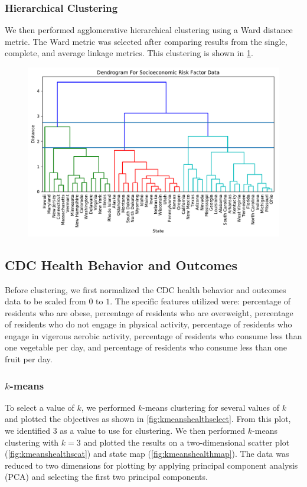 \documentclass{article}
\begin{document}
\subsubsection{Hierarchical Clustering}
We then performed agglomerative hierarchical clustering using a Ward distance metric. The Ward metric was selected after comparing results from the single, complete, and average linkage metrics. This clustering is shown in \cref{fig:dbsociodg}.

\begin{figure}[h]
\centering
\caption{}
\includegraphics[width=\linewidth]{images/socioeconomic_risk_factors_agglomerative_dendrogram.pdf}
\label{fig:dbsociodg}
\end{figure}

\subsection{CDC Health Behavior and Outcomes}
Before clustering, we first normalized the CDC health behavior and outcomes data to be scaled from $0$ to $1$. The specific features utilized were: percentage of residents who are obese, percentage of residents who are overweight, percentage of residents who do not engage in physical activity, percentage of residents who engage in vigerous aerobic activity, percentage of residents who consume less than one vegetable per day, and percentage of residents who consume less than one fruit per day.

\subsubsection{$k$-means}
To select a value of $k$, we performed $k$-means clustering for several values of $k$ and plotted the objectives as shown in \cref{fig:kmeanshealthselect}. From this plot, we identified $3$ as a value to use for clustering. We then performed $k$-means clustering with $k=3$ and plotted the results on a two-dimensional scatter plot (\ref{fig:kmeanshealthscat}) and state map (\ref{fig:kmeanshealthmap}). The data was reduced to two dimensions for plotting by applying principal component analysis (PCA) and selecting the first two principal components.
\end{document}
